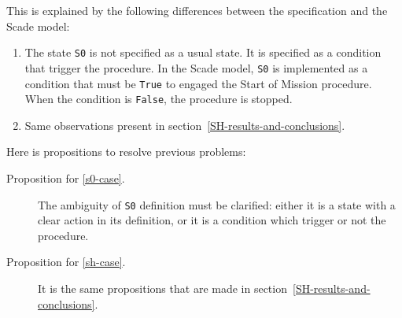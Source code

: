 This is explained by the following differences between the
specification and the Scade model:
\begin{enumerate}
\item \label{s0-case} The state \texttt{S0} is not specified as a
  usual state. It is specified as a condition that trigger the
  procedure. In the Scade model, \texttt{S0} is implemented as a
  condition that must be \texttt{True} to engaged the Start of Mission
  procedure. When the condition is \texttt{False}, the procedure is
  stopped.

\item \label{sh-case} Same observations present in
  section~\ref{SH-results-and-conclusions}.
\end{enumerate}


Here is propositions to resolve previous problems:
\begin{description}
\item[Proposition for \ref{s0-case}.] The ambiguity of \texttt{S0}
  definition must be clarified: either it is a state with a clear
  action in its definition, or it is a condition which trigger or not
  the procedure.
\item[Proposition for \ref{sh-case}.] It is the same propositions that
  are made in section~\ref{SH-results-and-conclusions}.
\end{description}
